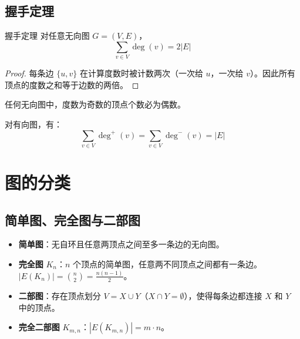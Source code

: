 \subsection{握手定理}

\begin{myTheorem}{握手定理}
对任意无向图 $G = (V, E)$，
\[
\sum_{v \in V} \deg(v) = 2|E|
\]
\end{myTheorem}

\begin{proof}
每条边 $\{u, v\}$ 在计算度数时被计数两次（一次给 $u$，一次给 $v$）。因此所有顶点的度数之和等于边数的两倍。
\end{proof}

\begin{corollary}
任何无向图中，度数为奇数的顶点个数必为偶数。
\end{corollary}

对有向图，有：
\[
\sum_{v \in V} \deg^{+}(v) = \sum_{v \in V} \deg^{-}(v) = |E|
\]

\section{图的分类}

\subsection{简单图、完全图与二部图}

\begin{mydefinition}{}
\begin{itemize}
    \item \textbf{简单图}：无自环且任意两顶点之间至多一条边的无向图。
    \item \textbf{完全图} $K_n$：$n$ 个顶点的简单图，任意两不同顶点之间都有一条边。$|E(K_n)| = \binom{n}{2} = \frac{n(n-1)}{2}$。
    \item \textbf{二部图}：存在顶点划分 $V = X \cup Y$（$X \cap Y = \emptyset$），使得每条边都连接 $X$ 和 $Y$ 中的顶点。
    \item \textbf{完全二部图} $K_{m,n}$：$|E(K_{m,n})| = m \cdot n$。
\end{itemize}
\end{mydefinition}

